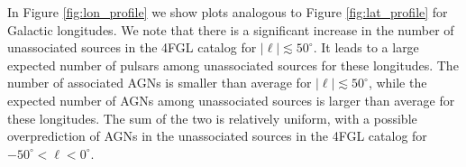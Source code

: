 In Figure \ref{fig:lon_profile} we show plots analogous to Figure \ref{fig:lat_profile} for Galactic longitudes.
We note that there is a significant increase in the number of unassociated sources in the 4FGL catalog for $|\ell | \lesssim 50^\circ$.
It leads to a large expected number of pulsars among unassociated sources for these longitudes.
The number of associated AGNs is smaller than average for $|\ell | \lesssim 50^\circ$, while the expected number of AGNs among unassociated sources is larger than average for these longitudes.
The sum of the two is relatively uniform, with a possible overprediction of AGNs in the unassociated sources in the 4FGL catalog for \mbox{$-50^\circ < \ell < 0^\circ$}.










